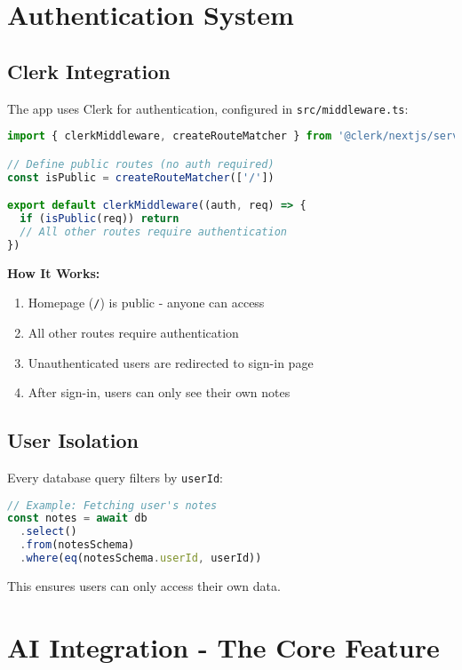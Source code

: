 \documentclass[11pt,a4paper]{article}
\begin{document}
\section{Authentication System}

\subsection{Clerk Integration}

The app uses Clerk for authentication, configured in \texttt{src/middleware.ts}:

\begin{lstlisting}[language=JavaScript]
import { clerkMiddleware, createRouteMatcher } from '@clerk/nextjs/server'

// Define public routes (no auth required)
const isPublic = createRouteMatcher(['/'])

export default clerkMiddleware((auth, req) => {
  if (isPublic(req)) return
  // All other routes require authentication
})
\end{lstlisting}

\textbf{How It Works:}
\begin{enumerate}
    \item Homepage (\texttt{/}) is public - anyone can access
    \item All other routes require authentication
    \item Unauthenticated users are redirected to sign-in page
    \item After sign-in, users can only see their own notes
\end{enumerate}

\subsection{User Isolation}

Every database query filters by \texttt{userId}:

\begin{lstlisting}[language=JavaScript]
// Example: Fetching user's notes
const notes = await db
  .select()
  .from(notesSchema)
  .where(eq(notesSchema.userId, userId))
\end{lstlisting}

This ensures users can only access their own data.


\section{AI Integration - The Core Feature}
\end{document}
